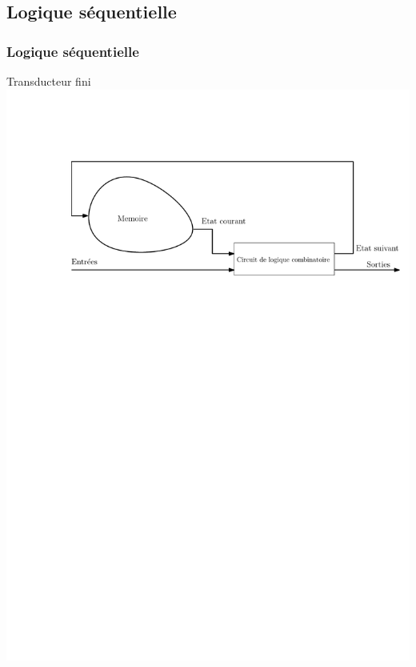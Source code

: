 \documentclass{beamer}
\begin{document}
\subsection{Logique séquentielle}

\begin{frame}
\frametitle{Logique séquentielle}

\begin{block}{Transducteur fini}
\vspace{1cm}
\centering\includegraphics[width=\linewidth]{Figs/intro_seq.pdf}
\vspace{1cm}
\end{block}

\end{frame}
\end{document}
